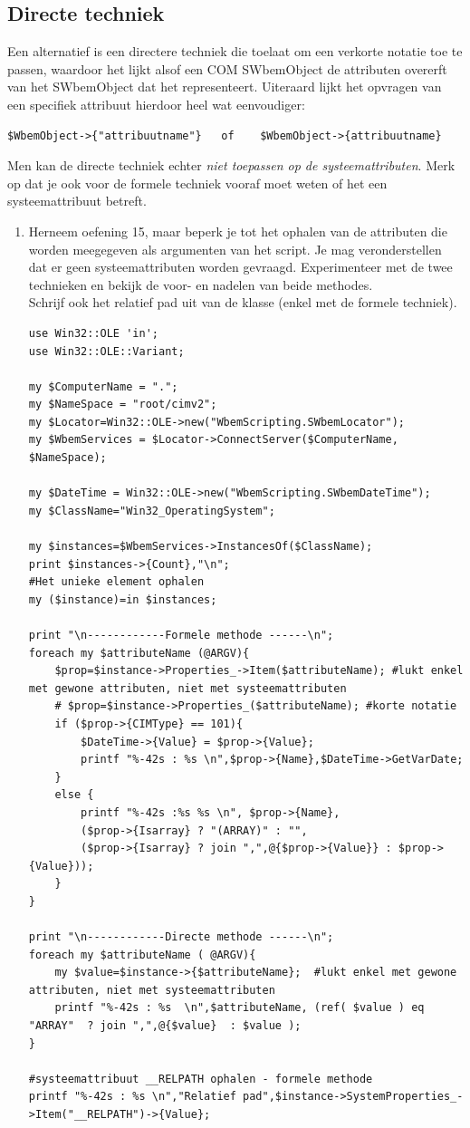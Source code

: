 \documentclass[11pt,a4paper]{report}
\begin{document}
\subsection{Directe techniek}
Een alternatief is een directere techniek die toelaat om een verkorte notatie toe te passen, waardoor het lijkt alsof een COM SWbemObject de attributen overerft van het SWbemObject dat het representeert. Uiteraard lijkt het opvragen van een specifiek attribuut hierdoor heel wat eenvoudiger:
\begin{lstlisting}
$WbemObject->{"attribuutname"}   of    $WbemObject->{attribuutname} 
\end{lstlisting}
Men kan de directe techniek echter \textit{niet toepassen op de systeemattributen}.
Merk op dat je ook voor de formele techniek vooraf moet weten of het een systeemattribuut betreft.
\begin{enumerate}[resume]
	\item Herneem oefening 15, maar beperk je tot het ophalen van de attributen die worden meegegeven als argumenten van het script. Je mag veronderstellen dat er geen systeemattributen worden gevraagd. Experimenteer met de twee technieken en bekijk de voor- en nadelen van beide methodes.
	\\Schrijf ook het relatief pad uit van de klasse (enkel met de formele techniek).
	\begin{lstlisting}
use Win32::OLE 'in';
use Win32::OLE::Variant;

my $ComputerName = ".";
my $NameSpace = "root/cimv2";
my $Locator=Win32::OLE->new("WbemScripting.SWbemLocator");
my $WbemServices = $Locator->ConnectServer($ComputerName, $NameSpace);

my $DateTime = Win32::OLE->new("WbemScripting.SWbemDateTime");
my $ClassName="Win32_OperatingSystem";

my $instances=$WbemServices->InstancesOf($ClassName);
print $instances->{Count},"\n";
#Het unieke element ophalen
my ($instance)=in $instances; 

print "\n------------Formele methode ------\n";
foreach my $attributeName (@ARGV){
	$prop=$instance->Properties_->Item($attributeName); #lukt enkel met gewone attributen, niet met systeemattributen 
	# $prop=$instance->Properties_($attributeName); #korte notatie
	if ($prop->{CIMType} == 101){
		$DateTime->{Value} = $prop->{Value};     
		printf "%-42s : %s \n",$prop->{Name},$DateTime->GetVarDate;
	}
	else {
		printf "%-42s :%s %s \n", $prop->{Name},
		($prop->{Isarray} ? "(ARRAY)" : "",
		($prop->{Isarray} ? join ",",@{$prop->{Value}} : $prop->{Value}));
	}
}

print "\n------------Directe methode ------\n";
foreach my $attributeName ( @ARGV){
	my $value=$instance->{$attributeName};  #lukt enkel met gewone attributen, niet met systeemattributen 
	printf "%-42s : %s  \n",$attributeName, (ref( $value ) eq "ARRAY"  ? join ",",@{$value}  : $value );
}

#systeemattribuut __RELPATH ophalen - formele methode
printf "%-42s : %s \n","Relatief pad",$instance->SystemProperties_->Item("__RELPATH")->{Value}; 
	\end{lstlisting}
\end{enumerate}
\end{document}
